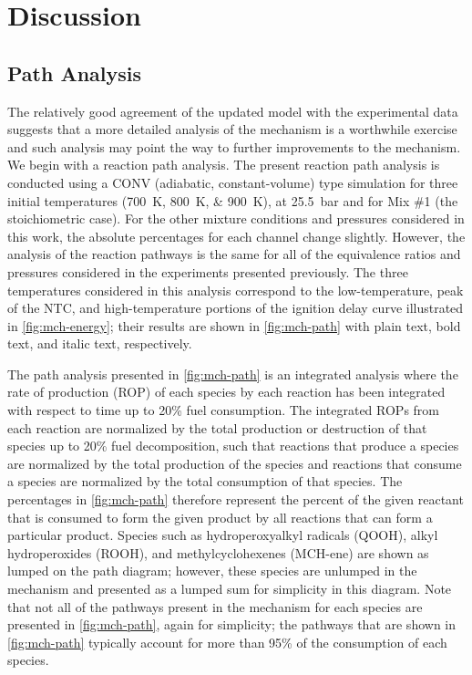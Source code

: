 \documentclass[../main.tex]{subfiles}
\begin{document}
\section{Discussion}
\label{sec:discussion}
\subsection{Path Analysis}
\label{sec:mch-path-analysis}

The relatively good agreement of the updated model with the experimental data
suggests that a more detailed analysis of the mechanism is a worthwhile
exercise and such analysis may point the way to further improvements to the
mechanism. We begin with a reaction path analysis. The present reaction path
analysis is conducted using a CONV (adiabatic, constant-volume) type simulation
for three initial temperatures (\SIlist{700;800;900}{\kelvin}), at \SI{25.5}{\bar} and for
Mix \#1 (the stoichiometric case). For the other mixture conditions and
pressures considered in this work, the absolute percentages for each channel
change slightly. However, the analysis of the reaction pathways is the same for
all of the equivalence ratios and pressures considered in the experiments
presented previously. The three temperatures considered in this analysis
correspond to the low-temperature, peak of the NTC, and high-temperature
portions of the ignition delay curve illustrated in \cref{fig:mch-energy};
their results are shown in \cref{fig:mch-path} with plain text, bold text,
and italic text, respectively.

The path analysis presented in \cref{fig:mch-path} is an integrated analysis
where the rate of production (ROP) of each species by each reaction has been
integrated with respect to time up to 20\% fuel consumption. The integrated
ROPs from each reaction are normalized by the total production or destruction
of that species up to 20\% fuel decomposition, such that reactions that produce
a species are normalized by the total production of the species and reactions
that consume a species are normalized by the total consumption of that species.
The percentages in \cref{fig:mch-path} therefore represent the percent of the given
reactant that is consumed to form the given product by all reactions that can
form a particular product. Species such as hydroperoxyalkyl radicals (QOOH),
alkyl hydroperoxides (ROOH), and methylcyclohexenes (MCH-ene) are shown as
lumped on the path diagram; however, these species are unlumped in the
mechanism and presented as a lumped sum for simplicity in this diagram. Note
that not all of the pathways present in the mechanism for each species are
presented in \cref{fig:mch-path}, again for simplicity; the pathways that are shown in
\cref{fig:mch-path} typically account for more than 95\% of the consumption
of each species.
\end{document}
